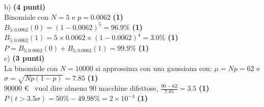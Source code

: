 \documentclass[10pt,a4paper,fleqn]{article}
\begin{document}
b) {\bf (4 punti)} \\
Binomiale con $N=5$ e $p=0.0062$ {\bf (1)} \\
$B_{5; 0.0062}(0)=(1-0.0062)^5=96.9\%$ {\bf (1)}\\
$B_{5; 0.0062}(1)=5\times 0.0062\times (1-0.0062)^4=3.0\%$ {\bf (1)}\\
$P=B_{5; 0.0062}(0)+B_{5; 0.0062}(1)=99.9\%$ {\bf (1)}\\
c) {\bf (3 punti)} \\
La binomiale con $N=10000$ si approssima con una gaussiana con: $\mu=Np=62$
e $\sigma=\sqrt{Np(1-p)}=7.85$ {\bf (1)}\\
90000 \euro ~ vuol dire almeno 90 macchine difettose, $\frac{90-62}{7.85}=3.5$ {\bf (1)}\\
$P(t>3.5\sigma)=50\%-49.98\%=2\times 10^{-4}$ {\bf (1)}\\
\end{document}
